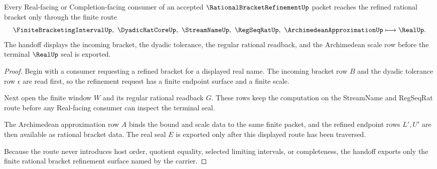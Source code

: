 \begin{theorem}
\label{thm:rational-bracket-refinement-l10-handoff}
Every Real-facing or Completion-facing consumer of an accepted $\RationalBracketRefinementUp$ packet reaches the refined rational bracket only through the finite route
$$
\FiniteBracketingIntervalUp,\ \DyadicRatCoreUp,\ \StreamNameUp,\ \RegSeqRatUp,\ \ArchimedeanApproximationUp \longmapsto \RealUp .
$$
The handoff displays the incoming bracket, the dyadic tolerance, the regular rational readback, and the Archimedean scale row before the terminal $\RealUp$ seal is exported.
\end{theorem}
\begin{proof}
Begin with a consumer requesting a refined bracket for a displayed real name. The incoming bracket row $B$ and the dyadic tolerance row $\epsilon$ are read first, so the refinement request has a finite endpoint surface and a finite scale.

Next open the finite window $W$ and its regular rational readback $G$. These rows keep the computation on the StreamName and RegSeqRat route before any Real-facing consumer can inspect the terminal seal.

The Archimedean approximation row $A$ binds the bound and scale data to the same finite packet, and the refined endpoint rows $L',U'$ are then available as rational bracket data. The real seal $E$ is exported only after this displayed route has been traversed.

Because the route never introduces host order, quotient equality, selected limiting intervals, or completeness, the handoff exports only the finite rational bracket refinement surface named by the carrier.
\end{proof}


